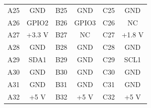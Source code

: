 \documentclass[a4paper]{article}
\begin{document}
\begin{table}[h]
\begin{center}
\begin{tabular}{cc|cc|cc}
            A25 & GND & B25 & GND & C25 & GND \\
            A26 & GPIO2 & B26 & GPIO3 & C26 & NC \\
            A27 & +3.3 V & B27 & NC & C27 & +1.8 V \\
            A28 & GND & B28 & GND & C28 & GND \\
            A29 & SDA1 & B29 & GND & C29 & SCL1 \\
            A30 & GND & B30 & GND & C30 & GND \\
            A31 & GND & B31 & GND & C31 & GND \\
            A32 & +5 V & B32 & +5 V & C32 & +5 V \\
            \hline
            \hline
        \end{tabular}
    \end{center}
\end{table}
\end{document}
